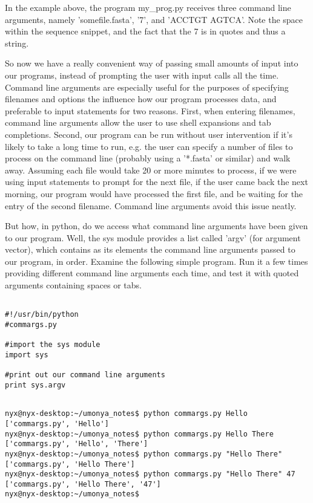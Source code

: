 In the example above, the program my\_prog.py receives three command   line arguments, namely 'somefile.fasta', '7', and 'ACCTGT AGTCA'. Note   the space within the sequence snippet, and the fact that the 7 is in   quotes and thus a string.

So now we have a really convenient way of passing small amounts of   input into our programs, instead of prompting the user with input   calls all the time. Command line arguments are especially useful for   the purposes of specifying filenames and options the influence how our   program processes data, and preferable to input statements for two   reasons. First, when entering filenames, command line arguments allow   the user to use shell expansions and tab completions. Second, our   program can be run without user intervention if it's likely to take a   long time to run, e.g. the user can specify a number of files to   process on the command line (probably using a '*.fasta' or similar) and   walk away. Assuming each file would take 20 or more minutes to process,   if we were using input statements to prompt for the next file, if   the user came back the next morning, our program would have processed   the first file, and be waiting for the entry of the second filename.   Command line arguments avoid this issue neatly.

But how, in python, do we access what command line arguments have   been given to our program. Well, the sys module provides a list called   'argv' (for argument vector), which contains as its elements the   command line arguments passed to our program, in order. Examine the   following simple program. Run it a few times providing different   command line arguments each time, and test it with quoted arguments   containing spaces or tabs.
\begin{lstlisting}

#!/usr/bin/python
#commargs.py

#import the sys module
import sys

#print out our command line arguments
print sys.argv
\end{lstlisting}
\begin{lstlisting}

nyx@nyx-desktop:~/umonya_notes$ python commargs.py Hello
['commargs.py', 'Hello']
nyx@nyx-desktop:~/umonya_notes$ python commargs.py Hello There
['commargs.py', 'Hello', 'There']
nyx@nyx-desktop:~/umonya_notes$ python commargs.py "Hello There"
['commargs.py', 'Hello There']
nyx@nyx-desktop:~/umonya_notes$ python commargs.py "Hello There" 47
['commargs.py', 'Hello There', '47']
nyx@nyx-desktop:~/umonya_notes$
\end{lstlisting}

